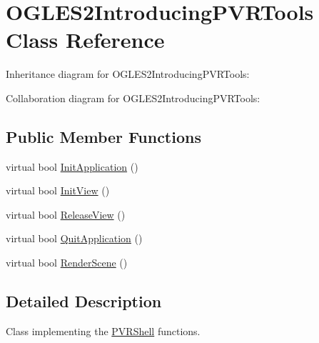 \hypertarget{class_o_g_l_e_s2_introducing_p_v_r_tools}{\section{O\+G\+L\+E\+S2\+Introducing\+P\+V\+R\+Tools Class Reference}
\label{class_o_g_l_e_s2_introducing_p_v_r_tools}
}


Inheritance diagram for O\+G\+L\+E\+S2\+Introducing\+P\+V\+R\+Tools\+:


Collaboration diagram for O\+G\+L\+E\+S2\+Introducing\+P\+V\+R\+Tools\+:
\subsection*{Public Member Functions}
\begin{DoxyCompactItemize}
\item 
virtual bool \hyperlink{class_o_g_l_e_s2_introducing_p_v_r_tools_a762da25f725eee95ec3a3410c9b5472b}{Init\+Application} ()
\item 
virtual bool \hyperlink{class_o_g_l_e_s2_introducing_p_v_r_tools_a885ab6eab7329e37287a72058044bce6}{Init\+View} ()
\item 
virtual bool \hyperlink{class_o_g_l_e_s2_introducing_p_v_r_tools_adc7e09f8b3fd655ffb5424a675c8db71}{Release\+View} ()
\item 
virtual bool \hyperlink{class_o_g_l_e_s2_introducing_p_v_r_tools_a6f09c284826a537fe8d095a3a9557a53}{Quit\+Application} ()
\item 
virtual bool \hyperlink{class_o_g_l_e_s2_introducing_p_v_r_tools_a334f7be8a795dfbe7cfcd022e75f9d7a}{Render\+Scene} ()
\end{DoxyCompactItemize}


\subsection{Detailed Description}


 Class implementing the \hyperlink{class_p_v_r_shell}{P\+V\+R\+Shell} functions. 

